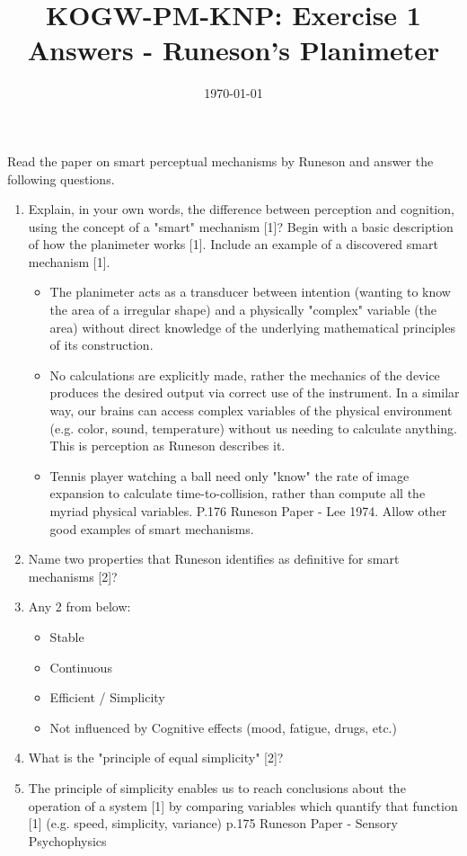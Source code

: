 \documentclass[12pt,english]{scrartcl}
\title{KOGW-PM-KNP:  Exercise 1 Answers - Runeson's Planimeter}
\author{}
\date{\today}
\begin{document}
\maketitle

\raggedright
Read the paper on smart perceptual mechanisms by Runeson and answer the following questions.

\begin{enumerate}
 \item Explain, in your own words, the difference between perception and cognition, using the concept of a "smart" mechanism [1]? Begin with a basic description of how the planimeter works [1]. Include an example of a discovered smart mechanism [1].
  \begin{itemize}
  \color{blue} 
  \item The planimeter acts as a transducer between intention (wanting to know the area of a irregular shape) and a physically "complex" variable (the area) without direct knowledge of the underlying mathematical principles of its construction. 
  \item No calculations are explicitly made, rather the mechanics of the device produces the desired output via correct use of the instrument. In a similar way, our brains can access complex variables of the physical environment (e.g. color, sound, temperature) without us needing to calculate anything.  This is perception as Runeson describes it.
  \item Tennis player watching a ball need only "know" the rate of image expansion to calculate time-to-collision, rather than compute all the myriad physical variables. P.176 Runeson Paper - Lee 1974. Allow other good examples of smart mechanisms.
  \end{itemize}
  
 \item Name two properties that Runeson identifies as definitive for smart mechanisms [2]?
  \color{blue}
  \item[]
  Any 2 from below:
  \begin{itemize}
  \item Stable 
  \item Continuous 
  \item Efficient / Simplicity
  \item Not influenced by Cognitive effects (mood, fatigue, drugs, etc.)
  \end{itemize}
 
 \color{black}
 \item What is the "principle of equal simplicity" [2]?
   \color{blue}
   \item[]
   The principle of simplicity enables us to reach conclusions about the operation of a system [1] by comparing variables which quantify that function [1] (e.g. speed, simplicity, variance) p.175 Runeson Paper - Sensory Psychophysics
 

\end{enumerate}
\end{document}
